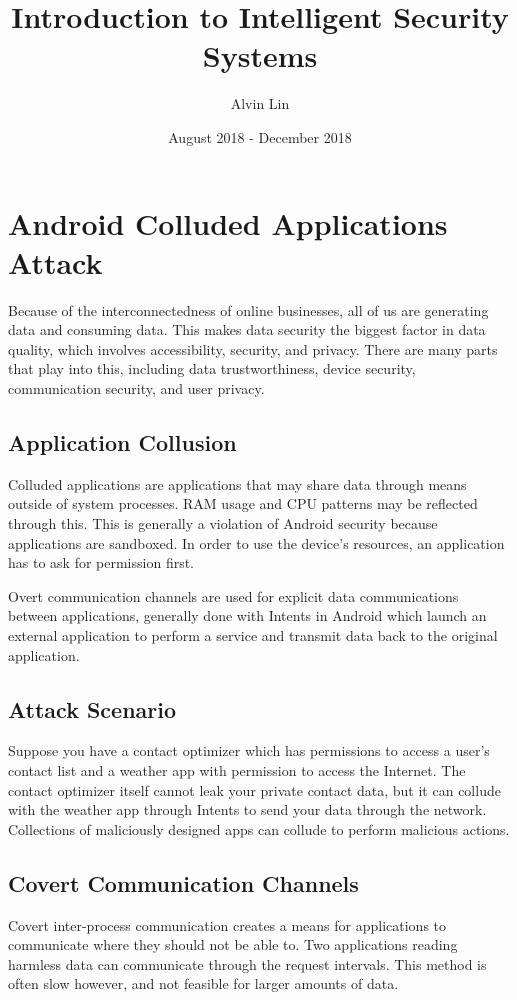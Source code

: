 \documentclass{math}
\title{Introduction to Intelligent Security Systems}
\author{Alvin Lin}
\date{August 2018 - December 2018}
\begin{document}
\maketitle

\section*{Android Colluded Applications Attack}
Because of the interconnectedness of online businesses, all of us are generating
data and consuming data. This makes data security the biggest factor in data
quality, which involves accessibility, security, and privacy. There are many
parts that play into this, including data trustworthiness, device security,
communication security, and user privacy.

\subsection*{Application Collusion}
Colluded applications are applications that may share data through means outside
of system processes. RAM usage and CPU patterns may be reflected through this.
This is generally a violation of Android security because applications are
sandboxed. In order to use the device's resources, an application has to ask
for permission first. \par
Overt communication channels are used for explicit data communications between
applications, generally done with Intents in Android which launch an external
application to perform a service and transmit data back to the original
application.

\subsection*{Attack Scenario}
Suppose you have a contact optimizer which has permissions to access a user's
contact list and a weather app with permission to access the Internet. The
contact optimizer itself cannot leak your private contact data, but it can
collude with the weather app through Intents to send your data through the
network. Collections of maliciously designed apps can collude to perform
malicious actions.

\subsection*{Covert Communication Channels}
Covert inter-process communication creates a means for applications to
communicate where they should not be able to. Two applications reading
harmless data can communicate through the request intervals. This method is
often slow however, and not feasible for larger amounts of data.
\end{document}
